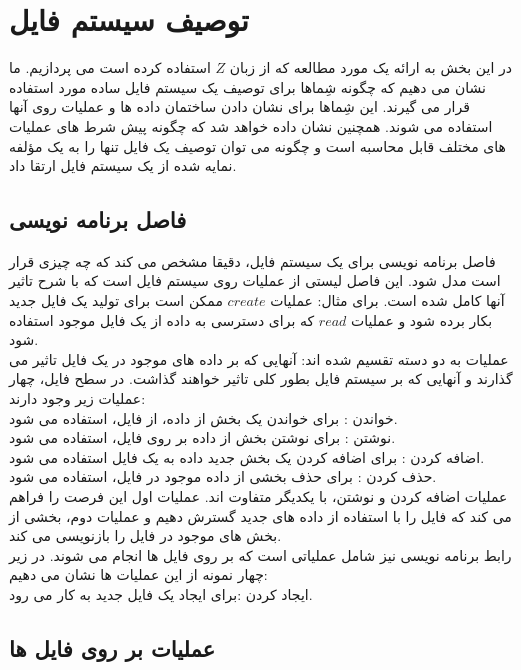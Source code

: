\chapter{ توصیف سیستم فایل}\label{chapter7}
 در این بخش به ارائه یک مورد مطالعه که از زبان $Z$ استفاده کرده است می پردازیم. ما نشان می دهیم که چگونه شِماها برای توصیف یک سیستم فایل ساده مورد استفاده قرار می گیرند. این شِماها برای نشان دادن ساختمان داده ها و عملیات روی آنها استفاده می شوند.
 همچنین نشان داده خواهد شد که چگونه پیش شرط های عملیات های مختلف قابل محاسبه است و چگونه می توان توصیف یک فایل تنها را به یک مؤلفه نمایه شده از یک سیستم فایل ارتقا داد. 
\section{فاصل برنامه نویسی}
 فاصل برنامه نویسی برای یک سیستم فایل، دقیقا مشخص می کند که چه چیزی قرار است مدل شود. این فاصل لیستی از عملیات روی سیستم فایل است که با شرح تاثیر آنها کامل شده است. برای مثال: عملیات $create$ ممکن است برای تولید یک فایل جدید بکار برده شود و عملیات $read$ که برای دسترسی به داده از یک فایل موجود استفاده شود.
 \\
 عملیات به دو دسته تقسیم شده اند: آنهایی که بر داده های موجود در یک فایل تاثیر می گذارند و آنهایی که بر سیستم فایل بطور کلی تاثیر خواهند گذاشت. در سطح فایل، چهار عملیات زیر وجود دارند:
 \\
 خواندن
  : برای خواندن یک بخش از داده، از فایل، استفاده می شود.
 \\
 نوشتن
 : برای نوشتن بخش از داده بر روی فایل، استفاده می شود.
 \\
 اضافه کردن
 : برای اضافه کردن یک بخش جدید داده به یک فایل استفاده می شود.
 \\
 حذف کردن
 : برای حذف بخشی از داده موجود در فایل، استفاده می شود.
 \\
عملیات اضافه کردن و نوشتن، با یکدیگر متفاوت اند. عملیات اول این فرصت را فراهم می کند که فایل را با استفاده از داده های جدید گسترش دهیم و عملیات دوم، بخشی از بخش های موجود در فایل را بازنویسی می کند. 
\\
رابط برنامه نویسی نیز شامل عملیاتی است که بر روی فایل ها انجام می شوند. در زیر چهار نمونه از این عملیات ها نشان می دهیم:
\\
ایجاد کردن
:برای ایجاد یک فایل جدید به کار می رود.
\\
  



\section{عملیات بر روی فایل ها}


